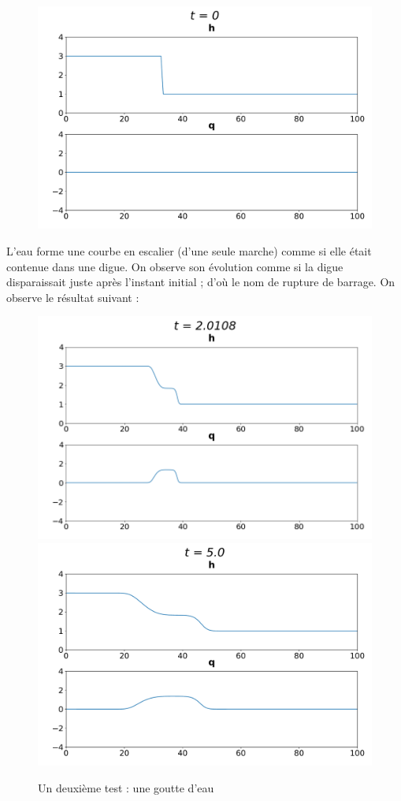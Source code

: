 \documentclass[
11pt, %
francais, %
singlespacing, %
headsepline, %
]{MastersDoctoralThesis} %
\theoremstyle{definition}
\begin{document}
\begin{figure}
\centering
\includegraphics[scale = .7]{barrage0}
\end{figure}

L'eau forme une courbe en escalier (d'une seule marche) comme si elle était contenue dans une digue. On observe son évolution comme si la digue disparaissait juste après l'instant initial ; d'où le nom de
rupture de barrage. On observe le résultat suivant :

\begin{figure}
\includegraphics[scale = .6]{barrage1}
\includegraphics[scale = .6]{barrage5} 
\caption{Un deuxième test : une goutte d'eau}
\end{figure}
\end{document}
